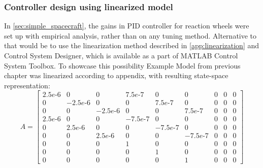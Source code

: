     \subsubsection{Controller design using linearized model}\label{sec:control_design}
        In \autoref{sec:simple_spacecraft}, the gains in PID controller for reaction wheels were set up with empirical analysis, rather than on any tuning method. Alternative to that would be to use the linearization method described in \autoref{app:linearization} and Control System Designer, which is available as a part of MATLAB Control System Toolbox. To showcase this possibility Example Model from previous chapter was linearized according to appendix, with resulting state-space representation:
        \small
        \begin{equation}
            A =
            \begin{bmatrix}
                2.5e \text{-}6 &            0 &            0 &      7.5e \text{-}7  &           0  &           0            & 0            & 0           &  0 \\
                      0 &     -2.5e \text{-}6 &            0 &            0  &     7.5e \text{-}7  &           0            & 0            & 0           &  0 \\
                      0 &            0 &     -2.5e \text{-}6 &            0  &           0  &     7.5e \text{-}7            & 0            & 0           &  0 \\
                2.5e \text{-}6 &            0 &            0 &     -7.5e \text{-}7  &           0  &           0            & 0            & 0           &  0 \\
                      0 &      2.5e \text{-}6 &            0 &            0  &    -7.5e \text{-}7  &           0            & 0            & 0           &  0 \\
                      0 &            0 &      2.5e \text{-}6 &            0  &           0  &    -7.5e \text{-}7            & 0            & 0           &  0 \\
                      0 &            0 &            0 &            1  &           0  &           0            & 0            & 0           &  0 \\
                      0 &            0 &            0 &            0  &           1  &           0            & 0            & 0           &  0 \\
                      0 &            0 &            0 &            0  &           0  &           1            & 0            & 0           &  0 
            \end{bmatrix}
        \end{equation}
        \normalsize
        
